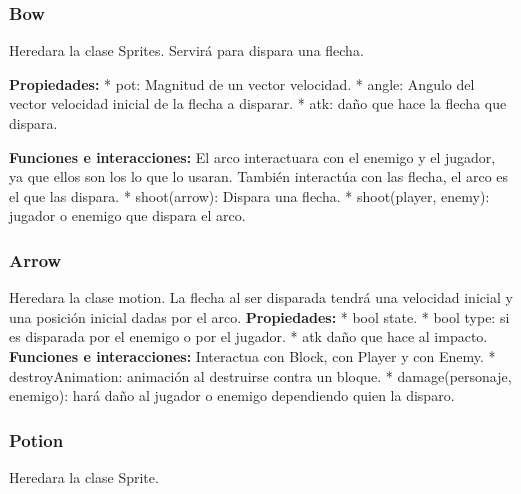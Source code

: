 \documentclass{article}
\begin{document}
\subsubsection*{Bow}
Heredara la clase Sprites. Servirá para dispara una flecha.\newline

\subitem \textbf{Propiedades:} \newline
* pot: Magnitud de un vector velocidad.\newline
* angle: Angulo del vector velocidad inicial de la flecha a disparar.\newline
* atk: daño que hace la flecha que dispara.\newline

\subitem \textbf{Funciones e interacciones:} \newline
El arco interactuara con el enemigo y el jugador, ya que ellos son los lo que lo usaran. También interactúa con las flecha, el arco es el que las dispara. \newline
* shoot(arrow): Dispara una flecha.\newline
* shoot(player, enemy): jugador o enemigo que dispara el arco.\newline

\subsubsection*{Arrow}
Heredara la clase motion. La flecha al ser disparada tendrá una velocidad inicial y una posición inicial dadas por el arco.\newline
\subitem \textbf{Propiedades:} \newline
* bool state.\newline
* bool type: si es disparada por el enemigo o por el jugador.\newline
* atk daño que hace al impacto.\newline
\subitem \textbf{Funciones e interacciones:} \newline
Interactua con Block, con Player y con Enemy. \newline
* destroyAnimation: animación al destruirse contra un bloque. \newline
* damage(personaje, enemigo): hará daño al jugador o enemigo dependiendo quien la disparo. \newline


\subsubsection*{Potion}
Heredara la clase Sprite. \newline
\end{document}
